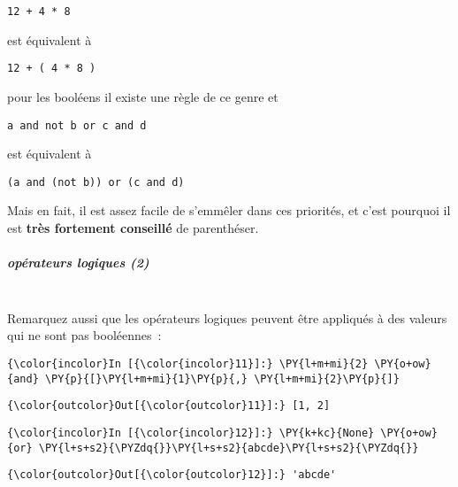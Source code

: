\begin{verbatim}
12 + 4 * 8 
\end{verbatim}

est équivalent à

\begin{verbatim}
12 + ( 4 * 8 )
\end{verbatim}

pour les booléens il existe une règle de ce genre et

\begin{verbatim}
a and not b or c and d
\end{verbatim}

est équivalent à

\begin{verbatim}
(a and (not b)) or (c and d)
\end{verbatim}

Mais en fait, il est assez facile de s'emmêler dans ces priorités, et
c'est pourquoi il est \textbf{très fortement conseillé} de parenthéser.

    \hypertarget{opuxe9rateurs-logiques-2}{%
\subparagraph{opérateurs logiques (2)\\\\}\label{opuxe9rateurs-logiques-2}}

    Remarquez aussi que les opérateurs logiques peuvent être appliqués à des
valeurs qui ne sont pas booléennes~:

    \begin{Verbatim}[commandchars=\\\{\}]
{\color{incolor}In [{\color{incolor}11}]:} \PY{l+m+mi}{2} \PY{o+ow}{and} \PY{p}{[}\PY{l+m+mi}{1}\PY{p}{,} \PY{l+m+mi}{2}\PY{p}{]}
\end{Verbatim}


\begin{Verbatim}[commandchars=\\\{\}]
{\color{outcolor}Out[{\color{outcolor}11}]:} [1, 2]
\end{Verbatim}
            
    \begin{Verbatim}[commandchars=\\\{\}]
{\color{incolor}In [{\color{incolor}12}]:} \PY{k+kc}{None} \PY{o+ow}{or} \PY{l+s+s2}{\PYZdq{}}\PY{l+s+s2}{abcde}\PY{l+s+s2}{\PYZdq{}}
\end{Verbatim}


\begin{Verbatim}[commandchars=\\\{\}]
{\color{outcolor}Out[{\color{outcolor}12}]:} 'abcde'
\end{Verbatim}
            
